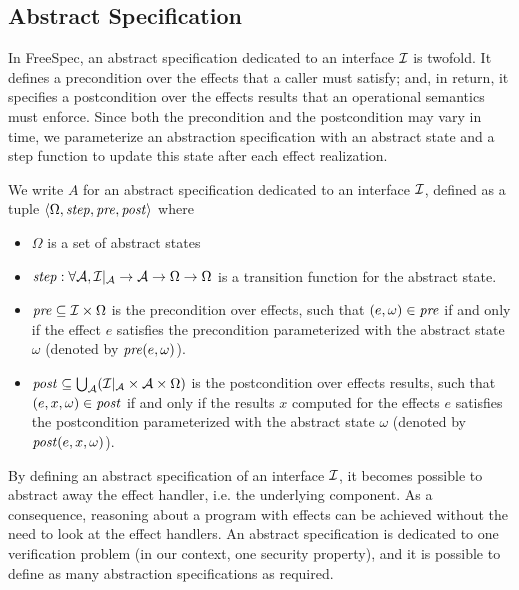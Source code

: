 \subsection{Abstract Specification}

In FreeSpec, an abstract specification dedicated to an interface $\mathcal{I}$ is
twofold.
%
It defines a precondition over the effects that a caller must satisfy; and, in
return, it specifies a postcondition over the effects results that an
operational semantics must enforce.
%
Since both the precondition and the postcondition may vary in time, we
parameterize an abstraction specification with an abstract state and a step
function to update this state after each effect realization.

\begin{definition} \label{def:freespec:abstract-specs}
  We write $A$ for an abstract specification dedicated to an interface $\mathcal{I}$,
  defined as a tuple
  $\langle \Omega, \mathit{step}, \mathit{pre}, \mathit{post} \rangle$ where
  \begin{itemize}
  \item $\Omega$ is a set of abstract states
  \item
    $\mathit{step} : \forall \mathcal{A}, \mathcal{I}|_{\mathcal{A}} \rightarrow
    \mathcal{A} \rightarrow \Omega \rightarrow \Omega$ is a transition function
    for the abstract state.
  \item $\mathit{pre} \subseteq \mathcal{I} \times \Omega$ is the precondition over
    effects, such that $(e, \omega) \in \mathit{pre}$ if and only if the effect
    $e$ satisfies the precondition parameterized with the abstract state
    $\omega$ (denoted by $\mathit{pre}(e, \omega)$).
  \item
    $\mathit{post} \subseteq \bigcup_{\mathcal{A}} (\mathcal{I}|_{\mathcal{A}}
    \times \mathcal{A} \times \Omega)$ is the postcondition over effects
    results, such that $(e, x, \omega) \in \mathit{post}$ if and only if the
    results $x$ computed for the effects $e$ satisfies the postcondition
    parameterized with the abstract state $\omega$ (denoted by
    $\mathit{post}(e, x, \omega)$).
  \end{itemize}
\end{definition}

By defining an abstract specification of an interface $\mathcal{I}$, it becomes possible
to abstract away the effect handler, i.e. the underlying component.
%
As a consequence, reasoning about a program with effects can be achieved without
the need to look at the effect handlers.
%
An abstract specification is dedicated to one verification problem (in our
context, one security property), and it is possible to define as many
abstraction specifications as required.

